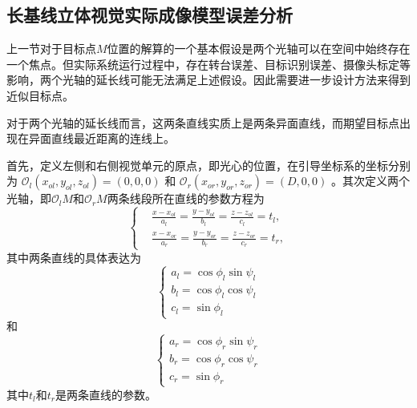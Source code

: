 \subsection{长基线立体视觉实际成像模型误差分析}
上一节对于目标点$M$位置的解算的一个基本假设是两个光轴可以在空间中始终存在一个焦点。但实际系统运行过程中，存在转台误差、目标识别误差、摄像头标定等影响，两个光轴的延长线可能无法满足上述假设。因此需要进一步设计方法来得到近似目标点。

对于两个光轴的延长线而言，这两条直线实质上是两条异面直线，而期望目标点出现在异面直线最近距离的连线上。

首先，定义左侧和右侧视觉单元的原点，即光心的位置，在引导坐标系的坐标分别为 $\mathcal{O}_l(x_{ol}, y_{ol}, z_{ol})=(0, 0, 0)$ 和 $\mathcal{O}_r(x_{or}, y_{or}, z_{or})=(D, 0, 0)$ 。其次定义两个光轴，即$\mathcal{O}_lM$和$\mathcal{O}_rM$两条线段所在直线的参数方程为
\begin{equation}  
\left \{
\begin{split}
&\frac{x-x_{ol}}{a_l} = \frac{y-y_{ol}}{b_l} = \frac{z-z_{ol}}{c_l} = t_l,\\
&\frac{x-x_{or}}{a_r} = \frac{y-y_{or}}{b_r} = \frac{z-z_{or}}{c_r} = t_r,
\end{split}
\right.
\end{equation}
其中两条直线的具体表达为
\begin{equation}  
\left\{ 
\begin{array}{lll} 
a_l = \cos \phi_l \sin \psi_l\\
b_l = \cos \phi_l \cos \psi_l\\
c_l = \sin \phi_l
\end{array} 
\right.
\end{equation}
和
\begin{equation} 
\left\{ 
\begin{array}{lll} 
a_r = \cos \phi_r \sin \psi_r\\
b_r = \cos \phi_r \cos \psi_r\\
c_r = \sin \phi_r
\end{array} 
\right.
\end{equation}
其中$t_l$和$t_r$是两条直线的参数。

